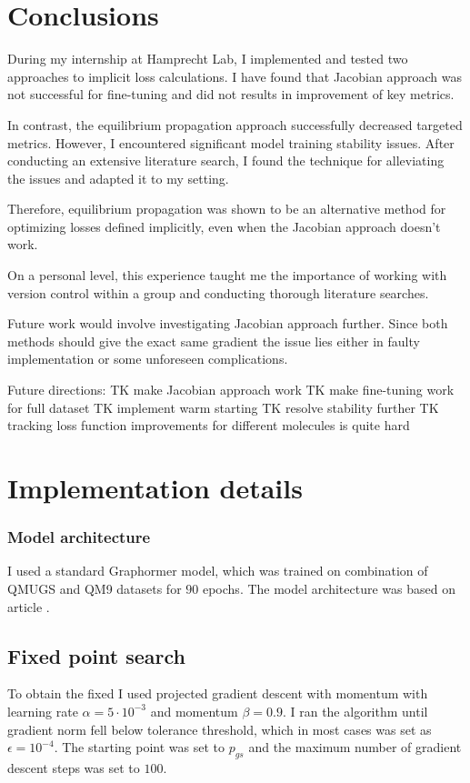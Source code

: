 \documentclass[a4paper,10.5pt]{report}
\begin{document}
\clearpage
\section{Conclusions}
During my internship at Hamprecht Lab, I implemented and tested two approaches to implicit loss calculations. I have found that Jacobian approach was not successful for fine-tuning and did not results in improvement of key metrics.

In contrast, the equilibrium propagation approach successfully decreased targeted metrics. However, I encountered significant model training stability issues. After conducting an extensive literature search, I found the technique for alleviating the issues and adapted it to my setting.

Therefore, equilibrium propagation was shown to be an alternative method for optimizing losses defined implicitly, even when the Jacobian approach doesn't work.

On a personal level, this experience taught me the importance of working with version control within a group and conducting thorough literature searches.

Future work would involve investigating Jacobian approach further. Since both methods should give the exact same gradient the issue lies either in faulty implementation or some unforeseen complications.


Future directions:
TK make Jacobian approach work
TK make fine-tuning work for full dataset
TK implement warm starting
TK resolve stability further
TK tracking loss function improvements for different molecules is quite hard
\nocite{*}





\appendix
\section{Implementation details} \label{sec:impl}

\subsubsection{Model architecture}
I used a standard Graphormer model, which was trained on combination of QMUGS and QM9 datasets for $90$ epochs. The model architecture was based on article \cite{zhang2024overcoming}.

\subsection{Fixed point search}
To obtain the fixed I used projected gradient descent with momentum with learning rate $\alpha = 5\cdot 10^{-3}$ and momentum $\beta = 0.9$. I ran the algorithm until gradient norm fell below tolerance threshold, which in most cases was set as $\epsilon = 10^{-4}$. The starting point was set to $p_{gs}$ and the maximum number of gradient descent steps was set to $100$.
\end{document}
